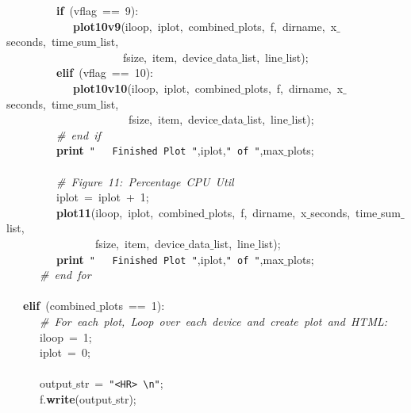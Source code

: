 \mbox{}\ \ \ \ \ \ \ \ \ \textbf{if}\ (vflag\ ==\ 9): \\
\mbox{}\ \ \ \ \ \ \ \ \ \ \ \ \textbf{plot10v9}(iloop,\ iplot,\ combined$\_$plots,\ f,\ dirname,\ x$\_$seconds,\ time$\_$sum$\_$list, \\
\mbox{}\ \ \ \ \ \ \ \ \ \ \ \ \ \ \ \ \ \ \ \ \ fsize,\ item,\ device$\_$data$\_$list,\ line$\_$list); \\
\mbox{}\ \ \ \ \ \ \ \ \ \textbf{elif}\ (vflag\ ==\ 10): \\
\mbox{}\ \ \ \ \ \ \ \ \ \ \ \ \textbf{plot10v10}(iloop,\ iplot,\ combined$\_$plots,\ f,\ dirname,\ x$\_$seconds,\ time$\_$sum$\_$list, \\
\mbox{}\ \ \ \ \ \ \ \ \ \ \ \ \ \ \ \ \ \ \ \ \ \ fsize,\ item,\ device$\_$data$\_$list,\ line$\_$list); \\
\mbox{}\ \ \ \ \ \ \ \ \ \textit{\#\ end\ if} \\
\mbox{}\ \ \ \ \ \ \ \ \ \textbf{print}\ \texttt{"{}\ \ \ Finished\ Plot\ "{}},iplot,\texttt{"{}\ of\ "{}},max$\_$plots; \\
\mbox{}\ \ \ \ \ \  \\
\mbox{}\ \ \ \ \ \ \ \ \ \textit{\#\ Figure\ 11:\ Percentage\ CPU\ Util} \\
\mbox{}\ \ \ \ \ \ \ \ \ iplot\ =\ iplot\ +\ 1; \\
\mbox{}\ \ \ \ \ \ \ \ \ \textbf{plot11}(iloop,\ iplot,\ combined$\_$plots,\ f,\ dirname,\ x$\_$seconds,\ time$\_$sum$\_$list, \\
\mbox{}\ \ \ \ \ \ \ \ \ \ \ \ \ \ \ \ fsize,\ item,\ device$\_$data$\_$list,\ line$\_$list); \\
\mbox{}\ \ \ \ \ \ \ \ \ \textbf{print}\ \texttt{"{}\ \ \ Finished\ Plot\ "{}},iplot,\texttt{"{}\ of\ "{}},max$\_$plots; \\
\mbox{}\ \ \ \ \ \ \textit{\#\ end\ for} \\
\mbox{}\ \ \ \ \ \  \\
\mbox{}\ \ \ \textbf{elif}\ (combined$\_$plots\ ==\ 1): \\
\mbox{}\ \ \ \ \ \ \textit{\#\ For\ each\ plot,\ Loop\ over\ each\ device\ and\ create\ plot\ and\ HTML:} \\
\mbox{}\ \ \ \ \ \ iloop\ =\ 1; \\
\mbox{}\ \ \ \ \ \ iplot\ =\ 0; \\
\mbox{}\ \ \ \ \ \ \  \\
\mbox{}\ \ \ \ \ \ output$\_$str\ =\ \texttt{"{}\textless{}HR\textgreater{}\ \textbackslash{}n"{}}; \\
\mbox{}\ \ \ \ \ \ f.\textbf{write}(output$\_$str); \\
